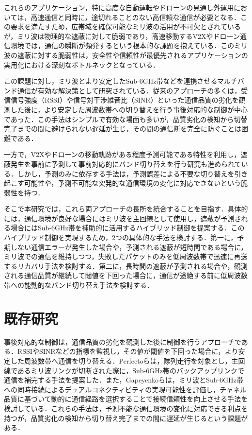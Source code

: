 \documentclass[10pt, twocolumn, a4j, platex]{jsarticle}	%
\begin{document}
これらのアプリケーション，特に高度な自動運転やドローンの見通し外運用においては，高速通信と同時に，途切れることのない高信頼な通信が必要となる．この要求を満たすため，広帯域を確保可能なミリ波の活用が不可欠とされているが，ミリ波は物理的な遮蔽に対して脆弱であり，高速移動するV2Xやドローン通信環境では，通信の瞬断が頻発するという根本的な課題を抱えている．このミリ波の遮蔽に対する脆弱性は，安全性や信頼性が最優先されるアプリケーションの実用化における深刻なボトルネックとなっている．

この課題に対し，ミリ波とより安定したSub-6GHz帯などを連携させるマルチバンド通信が有効な解決策として研究されている．従来のアプローチの多くは，受信信号強度（RSSI）や信号対干渉雑音比（SINR）といった通信品質の劣化を観測した後に，より安定した周波数帯への切り替えを行う事後対応的な制御が中心であった．この手法はシンプルで有効な場面も多いが，品質劣化の検知から切替完了までの間に避けられない遅延が生じ，その間の通信断を完全に防ぐことは困難である．

一方で，V2Xやドローンの移動軌跡がある程度予測可能である特性を利用し，遮蔽発生を事前に予測して事前対応的にバンド切り替えを行う研究も進められている．しかし，予測のみに依存する手法は，予測誤差による不要な切り替えを引き起こす可能性や，予測不可能な突発的な通信環境の変化に対応できないという脆弱性を持つ．

そこで本研究では，これら両アプローチの長所を統合することを目指す．具体的には，通信環境が良好な場合にはミリ波を主回線として使用し，遮蔽が予測される場合にはSub-6GHz帯を補助的に活用するハイブリッド制御を提案する．このハイブリッド制御を実現するため，2つの具体的な手法を検討する．第一に，予期しない通信エラーが発生した場合や，予測される遮蔽が短時間である場合に，ミリ波での通信を維持しつつ，失敗したパケットのみを低周波数帯で迅速に再送するリカバリ手法を検討する．第二に，長時間の遮蔽が予測される場合や，観測される通信品質が継続して閾値を下回った場合に，通信が途絶する前に低周波数帯への能動的なバンド切り替え手法を検討する．

\section{既存研究}

事後対応的な制御は，通信品質の劣化を観測した後に制御を行うアプローチである．RSSIやSINRなどの指標を監視し，その値が閾値を下回った場合に，より安定した周波数帯へ通信を切り替える．Perfectoら\cite{0001}は，隊列走行を対象とし，主回線であるミリ波リンクが切断された際に，Sub-6GHz帯のバックアップリンクで通信を補完する手法を提案した．また，Gapeyenkoら\cite{0002}は，ミリ波とSub-6GHz帯への同時接続によるデュアルコネクティビティの実現可能性を評価し，チャネル品質に基づいて動的に通信経路を選択することで接続信頼性を向上させる手法を検討している．これらの手法は，予測不能な通信環境の変化に対応できる利点を持つが，品質劣化の検知から切り替え完了までの間に遅延が生じるという課題がある．
\end{document}
